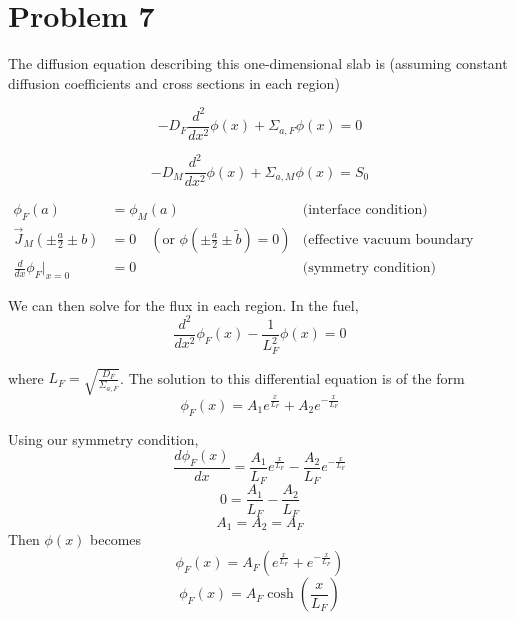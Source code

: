 \documentclass{article}
\newcommand{\Xs}{\Sigma}
\newcommand{\cur}{\vec{J}}
\begin{document}
\section*{Problem 7}

The diffusion equation describing this one-dimensional slab is (assuming constant diffusion coefficients and cross sections in each region)

$$ -D_F\frac{d^2}{dx^2}\phi(x) + \Xs_{a,F}\phi(x) = 0 $$

$$ -D_M\frac{d^2}{dx^2}\phi(x) + \Xs_{a,M}\phi(x) = S_0 $$

\begin{align*}
\phi_F(a) 	&= \phi_M(a)  & \text{(interface condition)} \\
\cur_M\left(\pm\frac{a}{2} \pm b\right)	&= 0 \quad (\text{or }\phi\left(\pm \frac{a}{2} \pm \tilde{b}\right)=0) & \text{(effective vacuum boundary condition)}\\
\frac{d}{dx}\phi_F\bigg|_{x=0}	&= 0 & \text{(symmetry condition)}
\end{align*}

We can then solve for the flux in each region. In the fuel,
$$ \frac{d^2}{dx^2}\phi_F(x) - \frac{1}{L_F^2}\phi(x) = 0 $$

where $L_F = \sqrt{\frac{D_F}{\Xs_{a,F}}}$. The solution to this differential equation is of the form
$$ \phi_F(x) = A_1 e^{\frac{x}{L_F}} + A_2 e^{-\frac{x}{L_F}} $$

Using our symmetry condition,
$$ \frac{d\phi_F(x)}{dx} = \frac{A_1}{L_F}e^{\frac{x}{L_F}} - \frac{A_2}{L_F} e^{-\frac{x}{L_F}} $$
$$ 0 = \frac{A_1}{L_F} - \frac{A_2}{L_F} $$
$$ A_1 = A_2 = A_F $$
Then $\phi(x)$ becomes
$$ \phi_F(x) = A_F \left(e^{\frac{x}{L_F}} + e^{-\frac{x}{L_F}}\right) $$
$$ \phi_F(x) = A_F \cosh\left(\frac{x}{L_F}\right) $$
\end{document}
